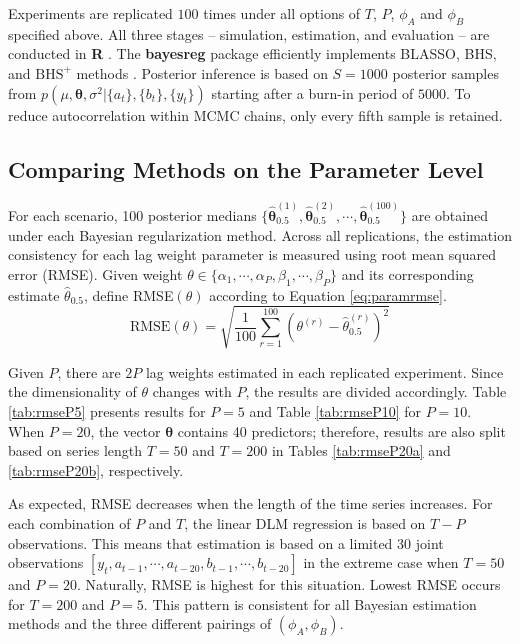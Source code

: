 Experiments are replicated $100$ times under all options of $T$, $P$, $\phi_A$ and $\phi_B$ specified above. All three stages -- simulation, estimation, and evaluation -- are conducted in \textbf{R} \citep{RCORETEAM}. The \textbf{bayesreg} package efficiently implements BLASSO, BHS, and $\textrm{BHS}^+$ methods \citep{bayesreg}. Posterior inference is based on $S=1000$ posterior samples from $p(\mu,\bm{\theta},\sigma^2|\{a_t\},\{b_t\},\{y_t\})$ starting after a burn-in period of $5000$. To reduce autocorrelation within MCMC chains, only every fifth sample is retained.

\subsection{Comparing Methods on the Parameter Level}
\label{sec:paramcomp}
For each scenario, 100 posterior medians $\{\hat{\bm{\theta}}^{(1)}_{0.5}, \hat{\bm{\theta}}^{(2)}_{0.5}, \cdots, \hat{\bm{\theta}}^{(100)}_{0.5}\}$ are obtained under each Bayesian regularization method. Across all replications, the estimation consistency for each lag weight parameter is measured using root mean squared error (RMSE). Given weight $\theta \in \{\alpha_1,\cdots,\alpha_P,\beta_1,\cdots,\beta_P\}$ and its corresponding estimate $\hat{\theta}_{0.5}$, define RMSE$(\theta)$ according to Equation \ref{eq:paramrmse}.
\begin{equation}
\label{eq:paramrmse}
\textrm{RMSE}(\theta)=\sqrt{\frac{1}{100}\sum\limits_{r=1}^{100}(\theta^{(r)}-\hat{\theta}^{(r)}_{0.5})^2}
\end{equation}

Given $P$, there are $2P$ lag weights estimated in each replicated experiment. Since the dimensionality of $\theta$ changes with $P$, the results are divided accordingly. Table \ref{tab:rmseP5} presents results for $P=5$ and Table \ref{tab:rmseP10} for $P=10$. When $P=20$, the vector $\bm{\theta}$ contains 40 predictors; therefore, results are also split based on series length $T=50$ and $T=200$ in Tables \ref{tab:rmseP20a} and \ref{tab:rmseP20b}, respectively. 

As expected, RMSE decreases when the length of the time series increases. For each combination of $P$ and $T$, the linear DLM regression is based on $T-P$ observations. This means that estimation is based on a limited 30 joint observations $[y_t,a_{t-1},\cdots,a_{t-20},b_{t-1},\cdots,b_{t-20}]$ in the extreme case when $T=50$ and $P=20$. Naturally, RMSE is highest for this situation. Lowest RMSE occurs for $T=200$ and $P=5$. This pattern is consistent for all Bayesian estimation methods and the three different pairings of $(\phi_A,\phi_B)$.

